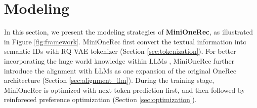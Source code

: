 \section{Modeling}
\label{method}
In this section, we present the modeling strategies of \textbf{MiniOneRec}, as illustrated in Figure \ref{fig:framework}. 
MiniOneRec first convert the textual information into semantic IDs with RQ-VAE tokenizer (Section \ref{sec:tokenization}). 
For better incorporating the huge world knowledge within LLMs \citep{LlaRA}, MiniOneRec further introduce the alignment with LLMs as one expansion of the original OneRec architecture (Section \ref{sec:alignment_llm}). 
During the training stage, MiniOneRec is optimized with next token prediction first, and then followed by reinforeced preference optimization (Section \ref{sec:optimization}). 



